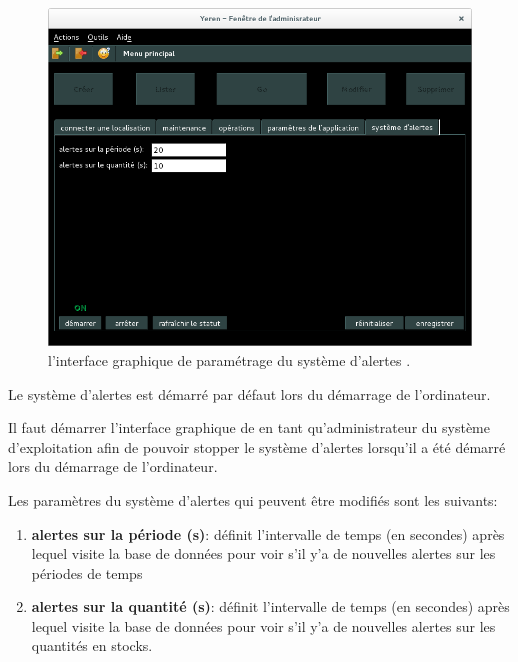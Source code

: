 \begin{figure}[!htpb]
	\centering
	\includegraphics[scale=0.45]{images/yeren-admin-alertes-config.png}
	\caption{l'interface graphique de param\'etrage du
		syst\`eme d'alertes \yeren.}\label{fig:yeren-admin-alertes-config}
\end{figure}

Le syst\`eme d'alertes est d\'emarr\'e par d\'efaut lors du
d\'emarrage de l'ordinateur. 

Il faut d\'emarrer l'interface graphique de \yeren en tant
qu'administrateur du syst\`eme d'exploitation afin de
pouvoir stopper le syst\`eme d'alertes lorsqu'il a \'et\'e
d\'emarr\'e lors du d\'emarrage de l'ordinateur.

Les param\`etres du syst\`eme d'alertes qui peuvent \^etre
modifi\'es sont les suivants:
\begin{enumerate}[1)]
	\item \textbf{alertes sur la p\'eriode (s)}: d\'efinit
		l'intervalle de temps (en secondes) apr\`es lequel
		\yeren visite la base de donn\'ees pour voir
		s'il y'a de nouvelles alertes sur les p\'eriodes de temps
		
	\item \textbf{alertes sur la quantit\'e (s)}: d\'efinit
		l'intervalle de temps (en secondes) apr\`es lequel
		\yeren visite la base de donn\'ees pour voir
		s'il y'a de nouvelles alertes sur les quantit\'es en stocks.\\
\end{enumerate}

